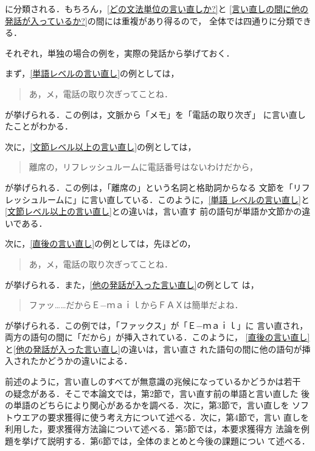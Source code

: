 \noindent に分類される．もちろん，\ref{どの文法単位の言い直しか?}と
\ref{言い直しの間に他の発話が入っているか?}の間には重複があり得るので，
全体では四通りに分類できる．

それぞれ，単独の場合の例を，実際の発話から挙げておく．

まず，\ref{単語レベルの言い直し}の例としては，

\begin{quote}
あ，メ，電話の取り次ぎってことね．
\end{quote}

\noindent が挙げられる．この例は，文脈から「メモ」を「電話の取り次ぎ」
に言い直したことがわかる．

次に，\ref{文節レベル以上の言い直し}の例としては，

\begin{quote}
離席の，リフレッシュルームに電話番号はないわけだから，
\end{quote}

\noindent が挙げられる．この例は，「離席の」という名詞と格助詞からなる
文節を「リフレッシュルームに」に言い直している．このように，\ref{単語
レベルの言い直し}と\ref{文節レベル以上の言い直し}との違いは，言い直す
前の語句が単語か文節かの違いである．

次に，\ref{直後の言い直し}の例としては，先ほどの，

\begin{quote}
あ，メ，電話の取り次ぎってことね．
\end{quote}

\noindent が挙げられる．また，\ref{他の発話が入った言い直し}の例として
は，

\begin{quote}
ファッ……だからＥ−ｍａｉｌからＦＡＸは簡単だよね．
\end{quote}

\noindent が挙げられる．この例では，「ファックス」が「Ｅ−ｍａｉｌ」に
言い直され，両方の語句の間に「だから」が挿入されている．このように，
\ref{直後の言い直し}と\ref{他の発話が入った言い直し}の違いは，言い直さ
れた語句の間に他の語句が挿入されたかどうかの違いによる．

前述のように，言い直しのすべてが無意識の兆候になっているかどうかは若干
の疑念がある．そこで本論文では，第2節で，言い直す前の単語と言い直した
後の単語のどちらにより関心があるかを調べる．次に，第3節で，言い直しを
ソフトウエアの要求獲得に使う考え方について述べる．次に，第4節で，言い
直しを利用した，要求獲得方法論について述べる．第5節では，本要求獲得方
法論を例題を挙げて説明する．第6節では，全体のまとめと今後の課題につい
て述べる．

